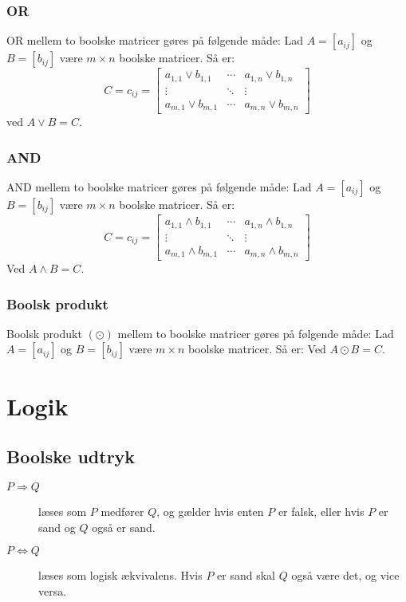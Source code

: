 \documentclass[a4paper]{article}
\begin{document}
    \subsubsection{OR}
      OR mellem to boolske matricer gøres på følgende måde:
      Lad $A = [a_{ij}]$ og $B= [b_{ij}]$ være $m \times n$ boolske matricer. Så er:
      $$
        C = c_{ij} = \begin{bmatrix}
                    a_{1,1} \vee b_{1,1} & \cdots & a_{1,n} \vee b_{1,n} \\
                    \vdots               & \ddots & \vdots \\
                    a_{m,1} \vee b_{m,1} & \cdots & a_{m,n} \vee b_{m,n}
                  \end{bmatrix}
      $$
      ved $A \vee B = C$.
    \subsubsection{AND}
      AND mellem to boolske matricer gøres på følgende måde:
      Lad $A = [a_{ij}]$ og $B= [b_{ij}]$ være $m \times n$ boolske matricer. Så er:
      $$
        C = c_{ij} = \begin{bmatrix}
                    a_{1,1} \wedge b_{1,1} & \cdots & a_{1,n} \wedge b_{1,n} \\
                    \vdots               & \ddots & \vdots \\
                    a_{m,1} \wedge b_{m,1} & \cdots & a_{m,n} \wedge b_{m,n}
                  \end{bmatrix}
      $$
      Ved $A \wedge B = C$.
    \subsubsection{Boolsk produkt} %
      Boolsk produkt $(\odot)$ mellem to boolske matricer gøres på følgende måde:
      Lad $A = [a_{ij}]$ og $B= [b_{ij}]$ være $m \times n$ boolske matricer. Så er:
      Ved $A \odot B = C$.

\section{Logik}

\subsection{Boolske udtryk}

\begin{description}
\item[$P \Rightarrow Q$] læses som $P$ medfører $Q$, og gælder hvis enten $P$ er falsk,
  eller hvis $P$ er sand og $Q$ også er sand.
\item[$P \Leftrightarrow Q$] læses som logisk ækvivalens. Hvis $P$ er sand skal $Q$ også
  være det, og vice versa.
\end{description}
\end{document}
